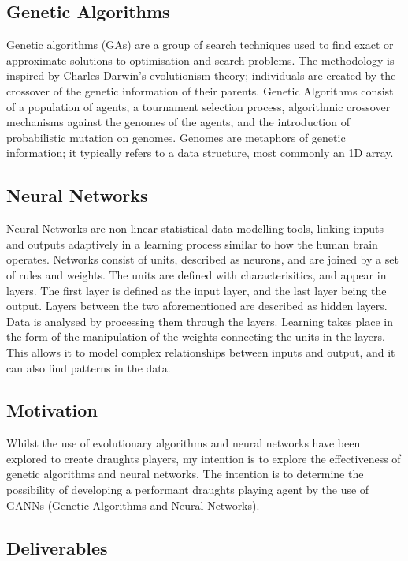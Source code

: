\documentclass[12pt,a4paper]{article}
\begin{document}
\subsection*{Genetic Algorithms}

    Genetic algorithms (GAs) are a group of search techniques used to find exact or approximate solutions to optimisation and search problems. The methodology is inspired by Charles Darwin's evolutionism theory; individuals are created by the crossover of the genetic information of their parents. Genetic Algorithms consist of a population of agents, a tournament selection process, algorithmic crossover mechanisms against the genomes of the agents, and the introduction of probabilistic mutation on genomes. Genomes are metaphors of genetic information; it typically refers to a data structure, most commonly an 1D array.

\subsection*{Neural Networks}

    Neural Networks are non-linear statistical data-modelling tools, linking inputs and outputs adaptively in a learning process similar to how the human brain operates. Networks consist of units, described as neurons, and are joined by a set of rules and weights. The units are defined with characterisitics, and appear in layers. The first layer is defined as the input layer, and the last layer being the output. Layers between the two aforementioned are described as hidden layers. Data is analysed by processing them through the layers. Learning takes place in the form of the manipulation of the weights connecting the units in the layers. This allows it to model complex relationships between inputs and output, and it can also find patterns in the data. 

\subsection*{Motivation}
    Whilst the use of evolutionary algorithms and neural networks have been explored to create draughts players, my intention is to explore the effectiveness of genetic algorithms and neural networks. The intention is to determine the possibility of developing a performant draughts playing agent by the use of GANNs (Genetic Algorithms and Neural Networks).

\subsection*{Deliverables}
\end{document}
